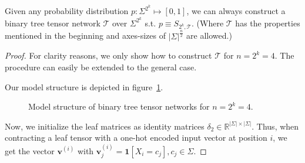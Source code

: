 \documentclass[../../main.tex]{subfiles}
\begin{document}
    \begin{theorem}
        \label{theorem:bttn_are_universal_approximators}
        Given any probability distribution $p: \Sigma^{2^k} \mapsto [0,1]$, we can always construct a binary tree tensor network $\mathcal{T}$ over $\Sigma^{2^k}$ s.t. $p \equiv S_{2^k, \mathcal{T}}$. (Where $\mathcal{T}$ has the properties mentioned in the beginning and axes-sizes of $|\Sigma|^{\frac{n}{2}}$ are allowed.)
    \end{theorem}
    \vspace{-2.5em}
    \begin{proof}
        For clarity reasons, we only show how to construct $\mathcal{T}$ for $n = 2^k = 4$. The procedure can easily be extended to the general case.

        Our model structure is depicted in figure~\ref{fig:binary_tree_tensor_network_n_equals_four}.

        \begin{figure}[h]
        \centering
        \caption{Model structure of binary tree tensor networks for $n = 2^k = 4$.}
        \label{fig:binary_tree_tensor_network_n_equals_four}
    \end{figure}

    Now, we initialize the leaf matrices as identity matrices $\delta_2 \in \mathbb{R}^{|\Sigma| \times |\Sigma|}$. Thus, when contracting a leaf tensor with a one-hot encoded input vector at position $i$, we get the vector $\bm{v}^{(i)}$ with $\bm{v}^{(i)}_j = \bm{1}[X_i = c_j], c_j \in \Sigma$.


\end{proof}
\end{document}
